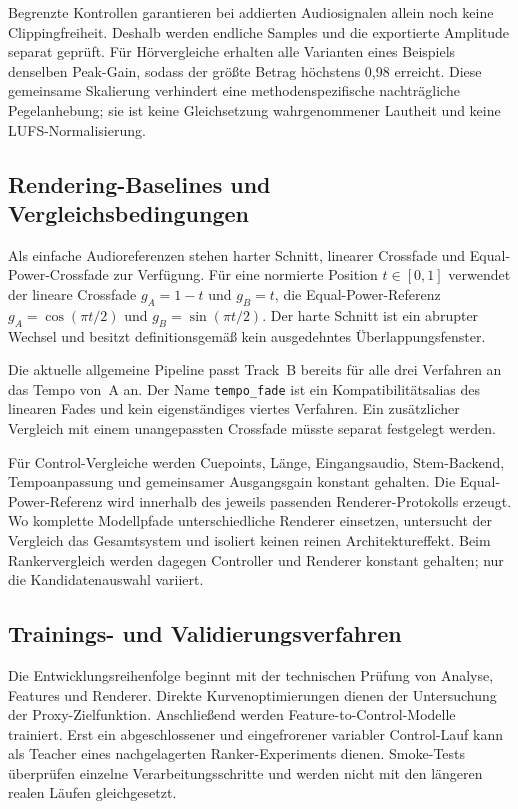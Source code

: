 Begrenzte Kontrollen garantieren bei addierten Audiosignalen allein noch keine Clippingfreiheit. Deshalb werden endliche Samples und die exportierte Amplitude separat geprüft. Für Hörvergleiche erhalten alle Varianten eines Beispiels denselben Peak-Gain, sodass der größte Betrag höchstens 0,98 erreicht. Diese gemeinsame Skalierung verhindert eine methodenspezifische nachträgliche Pegelanhebung; sie ist keine Gleichsetzung wahrgenommener Lautheit und keine LUFS-Normalisierung.

\subsection{Rendering-Baselines und Vergleichsbedingungen}
\label{sec:methodik-renderbaselines}

Als einfache Audioreferenzen stehen harter Schnitt, linearer Crossfade und Equal-Power-Crossfade zur Verfügung. Für eine normierte Position $t\in[0,1]$ verwendet der lineare Crossfade $g_A=1-t$ und $g_B=t$, die Equal-Power-Referenz $g_A=\cos(\pi t/2)$ und $g_B=\sin(\pi t/2)$. Der harte Schnitt ist ein abrupter Wechsel und besitzt definitionsgemäß kein ausgedehntes Überlappungsfenster.

Die aktuelle allgemeine Pipeline passt Track~B bereits für alle drei Verfahren an das Tempo von~A an. Der Name \texttt{tempo\_fade} ist ein Kompatibilitätsalias des linearen Fades und kein eigenständiges viertes Verfahren. Ein zusätzlicher Vergleich mit einem unangepassten Crossfade müsste separat festgelegt werden.

Für Control-Vergleiche werden Cuepoints, Länge, Eingangsaudio, Stem-Backend, Tempoanpassung und gemeinsamer Ausgangsgain konstant gehalten. Die Equal-Power-Referenz wird innerhalb des jeweils passenden Renderer-Protokolls erzeugt. Wo komplette Modellpfade unterschiedliche Renderer einsetzen, untersucht der Vergleich das Gesamtsystem und isoliert keinen reinen Architektureffekt. Beim Rankervergleich werden dagegen Controller und Renderer konstant gehalten; nur die Kandidatenauswahl variiert.

\subsection{Trainings- und Validierungsverfahren}
\label{sec:methodik-training}

Die Entwicklungsreihenfolge beginnt mit der technischen Prüfung von Analyse, Features und Renderer. Direkte Kurvenoptimierungen dienen der Untersuchung der Proxy-Zielfunktion. Anschließend werden Feature-to-Control-Modelle trainiert. Erst ein abgeschlossener und eingefrorener variabler Control-Lauf kann als Teacher eines nachgelagerten Ranker-Experiments dienen. Smoke-Tests überprüfen einzelne Verarbeitungsschritte und werden nicht mit den längeren realen Läufen gleichgesetzt.

